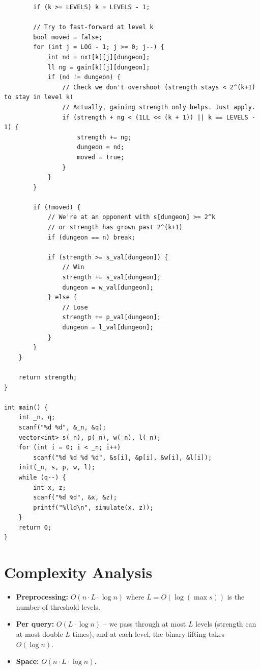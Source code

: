 \documentclass[11pt,a4paper]{article}
\begin{document}
\begin{lstlisting}
        if (k >= LEVELS) k = LEVELS - 1;

        // Try to fast-forward at level k
        bool moved = false;
        for (int j = LOG - 1; j >= 0; j--) {
            int nd = nxt[k][j][dungeon];
            ll ng = gain[k][j][dungeon];
            if (nd != dungeon) {
                // Check we don't overshoot (strength stays < 2^(k+1) to stay in level k)
                // Actually, gaining strength only helps. Just apply.
                if (strength + ng < (1LL << (k + 1)) || k == LEVELS - 1) {
                    strength += ng;
                    dungeon = nd;
                    moved = true;
                }
            }
        }

        if (!moved) {
            // We're at an opponent with s[dungeon] >= 2^k
            // or strength has grown past 2^(k+1)
            if (dungeon == n) break;

            if (strength >= s_val[dungeon]) {
                // Win
                strength += s_val[dungeon];
                dungeon = w_val[dungeon];
            } else {
                // Lose
                strength += p_val[dungeon];
                dungeon = l_val[dungeon];
            }
        }
    }

    return strength;
}

int main() {
    int _n, q;
    scanf("%d %d", &_n, &q);
    vector<int> s(_n), p(_n), w(_n), l(_n);
    for (int i = 0; i < _n; i++)
        scanf("%d %d %d %d", &s[i], &p[i], &w[i], &l[i]);
    init(_n, s, p, w, l);
    while (q--) {
        int x, z;
        scanf("%d %d", &x, &z);
        printf("%lld\n", simulate(x, z));
    }
    return 0;
}
\end{lstlisting}

\section{Complexity Analysis}
\begin{itemize}
  \item \textbf{Preprocessing:} $O(n \cdot L \cdot \log n)$ where $L = O(\log(\max s))$ is the number of threshold levels.
  \item \textbf{Per query:} $O(L \cdot \log n)$ -- we pass through at most $L$ levels (strength can at most double $L$ times), and at each level, the binary lifting takes $O(\log n)$.
  \item \textbf{Space:} $O(n \cdot L \cdot \log n)$.
\end{itemize}
\end{document}
